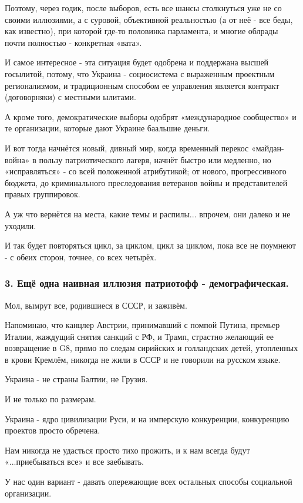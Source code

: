 Поэтому, через годик, после выборов, есть все шансы столкнуться уже не со
своими иллюзиями, а с суровой, объективной реальностью (а от неё - все беды,
как известно), при которой где-то половинка парламента, и многие облрады почти
полностью - конкретная «вата».

И самое интересное - эта ситуация будет одобрена и поддержана высшей госылитой,
потому, что Украина - социосистема с выраженным проектным регионализмом, и
традиционным способом ее управления является контракт (договорняки) с местными
ылитами.

А кроме того, демократические выборы одобрят «международное сообщество» и те
организации, которые дают Украине баальшие деньги.

И вот тогда начнётся новый, дивный мир, когда временный перекос «майдан-война»
в пользу патриотического лагеря, начнёт быстро или медленно, но «исправляться»
- со всей положенной атрибутикой; от нового, прогрессивного бюджета, до
криминального преследования ветеранов войны и представителей правых
группировок.

А уж что вернётся на места, какие темы и распилы... впрочем, они далеко и не
уходили.

И так будет повторяться цикл, за циклом, цикл за циклом, пока все не поумнеют -
с обеих сторон, точнее, со всех четырёх.

\subsubsection{3. Ещё одна наивная иллюзия патриотофф - демографическая.}

Мол, вымрут все, родившиеся в СССР, и заживём.

Напоминаю, что канцлер Австрии, принимавший с помпой Путина, премьер Италии,
жаждущий снятия санкций с РФ, и Трамп, страстно желающий ее возвращение в G8,
прямо по следам сирийских и голландских детей, утопленных в крови Кремлём,
никогда не жили в СССР и не говорили на русском языке.

Украина - не страны Балтии, не Грузия.

И не только по размерам.

Украина - ядро цивилизации Руси, и на имперскую конкуренции, конкуренцию
проектов просто обречена.

Нам никогда не удасться просто тихо прожить, и к нам всегда будут
«...приебываться все» и все заебывать.

У нас один вариант - давать опережающие всех остальных способы социальной
организации.

